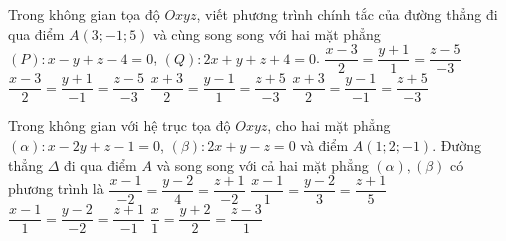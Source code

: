 \begin{ex}%
	Trong không gian tọa độ $Oxyz$, viết phương trình chính tắc của đường thẳng đi qua điểm $A(3;-1;5)$ và cùng song song với hai mặt phẳng $(P)\colon x-y+z-4=0$, $(Q)\colon 2x+y+z+4=0$.
	\choice
	{$\dfrac{x-3}{2}=\dfrac{y+1}{1}=\dfrac{z-5}{-3}$}
	{\True $\dfrac{x-3}{2}=\dfrac{y+1}{-1}=\dfrac{z-5}{-3}$}
	{$\dfrac{x+3}{2}=\dfrac{y-1}{1}=\dfrac{z+5}{-3}$}
	{$\dfrac{x+3}{2}=\dfrac{y-1}{-1}=\dfrac{z+5}{-3}$}
\end{ex}
\begin{ex}%
	Trong không gian với hệ trục tọa độ $Oxyz$, cho hai mặt phẳng $\left( \alpha \right)\colon x-2y+z-1=0$, $\left( \beta \right)\colon 2x+y-z=0$ và điểm $A(1;2;-1)$. Đường thẳng $\Delta $ đi qua điểm $A$ và song song với cả hai mặt phẳng $\left( \alpha \right),\left( \beta \right)$ có phương trình là
	\choice
	{$\dfrac{x-1}{-2}=\dfrac{y-2}{4}=\dfrac{z+1}{-2}$}
	{\True $\dfrac{x-1}{1}=\dfrac{y-2}{3}=\dfrac{z+1}{5}$}
	{$\dfrac{x-1}{1}=\dfrac{y-2}{-2}=\dfrac{z+1}{-1}$}
	{$\dfrac{x}{1}=\dfrac{y+2}{2}=\dfrac{z-3}{1}$}
\end{ex}

